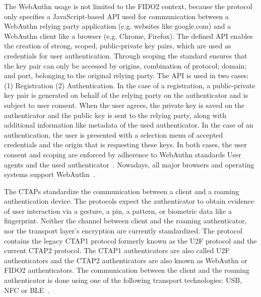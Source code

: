 \documentclass[runningheads]{llncs}
\begin{document}
The WebAuthn usage is not limited to the FIDO2 context, because the protocol only specifies a JavaScript-based API used for communication between a WebAuthn relying party application (e.g. websites like google.com) and a WebAuthn client like a browser (e.g. Chrome, Firefox). The defined API enables the creation of strong, scoped, public-private key pairs, which are used as credentials for user authentication. Through scoping the standard ensures that the key pair can only be accessed by origins, combination of protocol; domain; and port, belonging to the original relying party. The API is used in two cases: (1) Registration (2) Authentication. In the case of a registration, a public-private key pair is generated  on behalf of the relying party on the authenticator and is subject to user consent. When the user agrees, the private key is saved on the authenticator and the public key is sent to the relying party, along with additional information like metadata of the used authenticator. In the case of an authentication, the user is presented with a selection menu of accepted credentials and the origin that is requesting these keys. In both cases, the user consent and scoping are enforced by adherence to WebAuthn standards User agents and the used authenticator~\cite{000002}. Nowadays, all major browsers and operating systems support WebAuthn~\cite{000001}.

The CTAPs standardize the communication between a client and a roaming authentication device. The protocols expect the authenticator to obtain evidence of user interaction via a gesture, a pin, a pattern, or biometric data like a fingerprint. Neither the channel between client and the roaming authenticator, nor the transport layer's encryption are currently standardized. The protocol contains the legacy CTAP1 protocol formerly known as the U2F protocol and the current CTAP2 protocol. The CTAP1 authenticators are also called U2F authenticators and the CTAP2 authenticators are also known as WebAuthn or FIDO2 authenticators. The communication between the client and the roaming authenticator is done using one of the following transport technologies: USB, NFC or BLE~\cite{000003,274547,9099190}.
\end{document}
